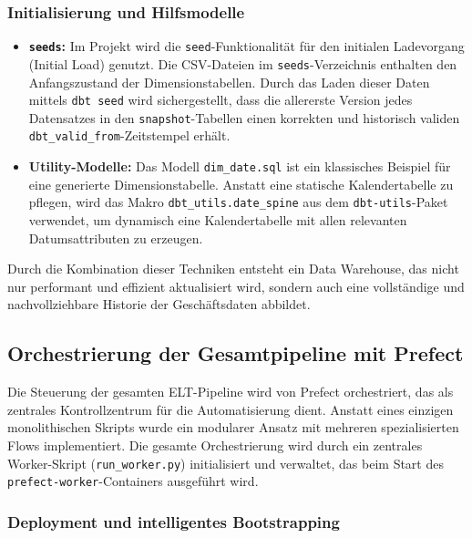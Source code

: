\documentclass[
    12pt,               
    a4paper,        
    ngerman            
]{scrartcl}
\begin{document}
\subsubsection{Initialisierung und Hilfsmodelle}
\label{sssec:dbt_hilfsmodelle}
\begin{itemize}
    \item \textbf{\texttt{seeds}:} Im Projekt wird die \texttt{seed}-Funktionalität für den initialen Ladevorgang (Initial Load) genutzt. Die CSV-Dateien im \texttt{seeds}-Verzeichnis enthalten den Anfangszustand der Dimensionstabellen. Durch das Laden dieser Daten mittels \texttt{dbt seed} wird sichergestellt, dass die allererste Version jedes Datensatzes in den \texttt{snapshot}-Tabellen einen korrekten und historisch validen \texttt{dbt\_valid\_from}-Zeitstempel erhält.

    \item \textbf{Utility-Modelle:} Das Modell \texttt{dim\_date.sql} ist ein klassisches Beispiel für eine generierte Dimensionstabelle. Anstatt eine statische Kalendertabelle zu pflegen, wird das Makro \texttt{dbt\_utils.date\_spine} aus dem \texttt{dbt-utils}-Paket verwendet, um dynamisch eine Kalendertabelle mit allen relevanten Datumsattributen zu erzeugen.
\end{itemize}
Durch die Kombination dieser Techniken entsteht ein Data Warehouse, das nicht nur performant und effizient aktualisiert wird, sondern auch eine vollständige und nachvollziehbare Historie der Geschäftsdaten abbildet.

\subsection{Orchestrierung der Gesamtpipeline mit Prefect}
\label{sec:prefect_orchestrierung}

Die Steuerung der gesamten ELT-Pipeline wird von Prefect orchestriert, das als zentrales Kontrollzentrum für die Automatisierung dient. Anstatt eines einzigen monolithischen Skripts wurde ein modularer Ansatz mit mehreren spezialisierten Flows implementiert. Die gesamte Orchestrierung wird durch ein zentrales Worker-Skript (\texttt{run\_worker.py}) initialisiert und verwaltet, das beim Start des \texttt{prefect-worker}-Containers ausgeführt wird.

\subsubsection{Deployment und intelligentes Bootstrapping}
\label{subsec:prefect_bootstrapping}
\end{document}
